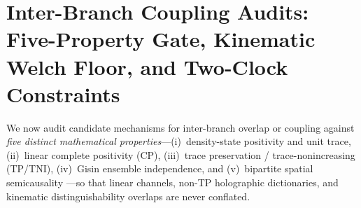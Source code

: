 \documentclass[11pt,a4paper]{article}
\theoremstyle{definition}
\theoremstyle{remark}
\newcommand{\1}{\mathbf{1}}
\begin{document}
\section{Inter-Branch Coupling Audits: Five-Property Gate, Kinematic Welch Floor, and Two-Clock Constraints}\label{sec:branch-coupling}

We now audit candidate mechanisms for inter-branch overlap or coupling against \emph{five distinct mathematical properties}---(i)~density-state positivity and unit trace, (ii)~linear complete positivity (CP), (iii)~trace preservation / trace-nonincreasing (TP/TNI), (iv)~Gisin ensemble independence, and (v)~bipartite spatial semicausality \cite{Beckman2001}---so that linear channels, non-TP holographic dictionaries, and kinematic distinguishability overlaps are never conflated.
\end{document}
